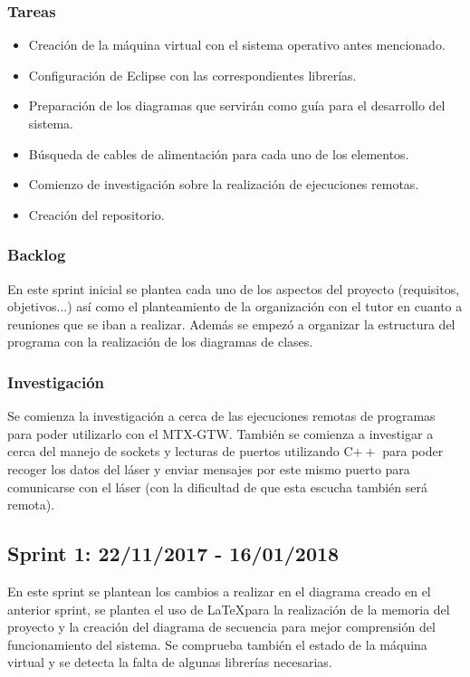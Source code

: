 \subsubsection{Tareas}
\begin{itemize}
	\item Creación de la máquina virtual con el sistema operativo antes mencionado.
	\item Configuración de Eclipse con las correspondientes librerías.
	\item Preparación de los diagramas que servirán como guía para el desarrollo del sistema.
	\item Búsqueda de cables de alimentación para cada uno de los elementos.
	\item Comienzo de investigación sobre la realización de ejecuciones remotas.
	\item Creación del repositorio.
\end{itemize}
\subsubsection{Backlog}
En este sprint inicial se plantea cada uno de los aspectos del proyecto (requisitos, objetivos...) así como el planteamiento de la organización con el tutor en cuanto a reuniones que se iban a realizar. Además se empezó a organizar la estructura del programa con la realización de los diagramas de clases.\\
\subsubsection{Investigación}
Se comienza la investigación a cerca de las ejecuciones remotas de programas para poder utilizarlo con el MTX-GTW. También se comienza a investigar a cerca del manejo de sockets y lecturas de puertos utilizando C$++$ para poder recoger los datos del láser y enviar mensajes por este mismo puerto para comunicarse con el láser (con la dificultad de que esta escucha también será remota).\\

\subsection{Sprint 1: 22/11/2017 - 16/01/2018}
En este sprint se plantean los cambios a realizar en el diagrama creado en el anterior sprint, se plantea el uso de \LaTeX para la realización de la memoria del proyecto y la creación del diagrama de secuencia para mejor comprensión del funcionamiento del sistema. Se comprueba también el estado de la máquina virtual y se detecta la falta de algunas librerías necesarias. \\
